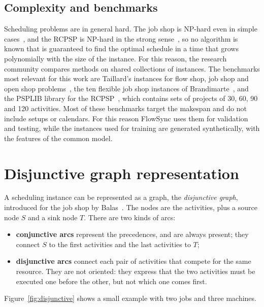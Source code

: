 \subsection{Complexity and benchmarks}

Scheduling problems are in general hard. The job shop is NP-hard even in simple
cases~\cite{garey1976}, and the RCPSP is NP-hard in the strong sense~\cite{blazewicz1983}, so no
algorithm is known that is guaranteed to find the optimal schedule in a time that grows
polynomially with the size of the instance. For this reason, the research community
compares methods on shared collections of instances. The benchmarks most relevant for this work
are Taillard's instances for flow shop, job shop and open shop problems~\cite{taillard1993}, the
ten flexible job shop instances of Brandimarte~\cite{brandimarte1993}, and the PSPLIB library for
the RCPSP~\cite{kolisch1997}, which contains sets of projects of 30, 60, 90 and 120 activities.
Most of these benchmarks target the makespan and do not include setups or calendars. For this
reason FlowSync uses them for validation and testing, while the instances used for training are
generated synthetically, with the features of the common model.

\section{Disjunctive graph representation}
\label{sec:graph}

A scheduling instance can be represented as a graph, the \emph{disjunctive graph}, introduced for
the job shop by Balas~\cite{balas1969}. The nodes are the activities, plus a source node $S$ and
a sink node $T$. There are two kinds of arcs:
\begin{itemize}
  \item \textbf{conjunctive arcs} represent the precedences, and are always present; they connect
        $S$ to the first activities and the last activities to $T$;
  \item \textbf{disjunctive arcs} connect each pair of activities that compete for the same
        resource. They are not oriented: they express that the two activities must be executed
        one before the other, but not which one comes first.
\end{itemize}
Figure~\ref{fig:disjunctive} shows a small example with two jobs and three machines.

